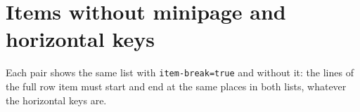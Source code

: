 \documentclass{article}
\begin{document}

\section{Items without minipage and horizontal keys}

Each pair shows the same list with \texttt{item-break=true} and without it:
the lines of the full row item must start and end at the same places in both
lists, whatever the horizontal keys are.

\newcommand\KROWS
  {%
    \item One
    \item Two
    \item(2) Full row item with enough text to use two lines of the page: this
      sentence repeats. This sentence repeats to fill the line.

      Second paragraph of the full row item.
    \item Four
  }
\newcommand\KEYPAIR[2]
  {%
    \par\medskip\noindent\texttt{#2}, \texttt{item-break=true}:\par\nobreak
    \begin{#1}[columns=2,item-break=true,#2]
      \KROWS
    \end{#1}
    \par\medskip\noindent\texttt{#2}, without \texttt{item-break}:\par\nobreak
    \begin{#1}[columns=2,#2]
      \KROWS
    \end{#1}
  }
\end{document}

